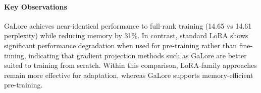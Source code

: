 \paragraph{Key Observations}
GaLore achieves near-identical performance to full-rank training (14.65 vs 14.61 perplexity) while reducing memory by 31\%. In contrast, standard LoRA shows significant performance degradation when used for pre-training rather than fine-tuning, indicating that gradient projection methods such as GaLore are better suited to training from scratch. Within this comparison, LoRA-family approaches remain more effective for adaptation, whereas GaLore supports memory-efficient pre-training.
